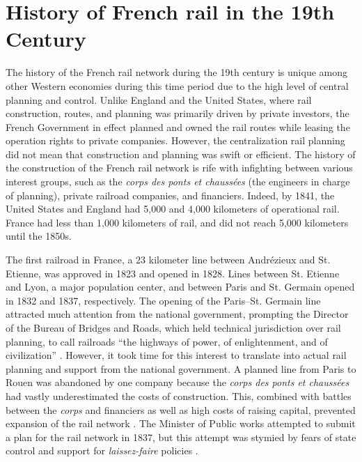 \documentclass[12pt,twoside]{article}
\begin{document}

\section{History of French rail in the 19th Century}

The history of the French rail network during the 19th century is unique among other Western economies during this time period due to the high level of central planning and control.
Unlike England and the United States, where rail construction, routes, and planning was primarily driven by private investors, the French Government in effect planned and owned the rail routes while leasing the operation rights to private companies.
However, the centralization rail planning did not mean that construction and planning was swift or efficient.
The history of the construction of the French rail network is rife with infighting between various interest groups, such as the \emph{corps des ponts et chauss\'{e}es} (the engineers in charge of planning), private railroad companies, and financiers.
Indeed, by 1841, the United States and England had 5,000 and 4,000 kilometers of operational rail.
France had less than 1,000 kilometers of rail, and did not reach 5,000 kilometers until the 1850s.

The first railroad in France, a 23 kilometer line between Andr\'{e}zieux and St. Etienne, was approved in 1823 and opened in 1828.
Lines between St. Etienne and Lyon, a major population center, and between Paris and St. Germain opened in 1832 and 1837, respectively.
The opening of the Paris--St. Germain line attracted much attention from the national government, prompting the Director of the Bureau of Bridges and Roads, which held technical jurisdiction over rail planning, to call railroads ``the highways of power, of enlightenment, and of civilization'' \citep{doukas}.
However, it took time for this interest to translate into actual rail planning and support from the national government.
A planned line from Paris to Rouen was abandoned by one company because the \emph{corps des ponts et chauss\'{e}es} had vastly underestimated the costs of construction.
This, combined with battles between the \emph{corps} and financiers as well as high costs of raising capital, prevented expansion of the rail network \citep{dunham}.
The Minister of Public works attempted to submit a plan for the rail network in 1837, but this attempt was stymied by fears of state control and support for \emph{laissez-faire} policies \citep{clapham}.
\end{document}
